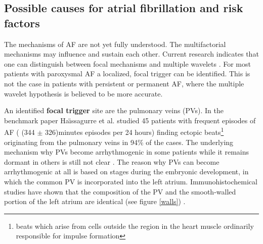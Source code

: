   
% 
% 


\newpage
\subsection{Possible causes for atrial fibrillation and risk factors}
\label{AFriskfactor}

The mechanisms of AF are not yet fully understood. The multifactorial mechanisms may influence and sustain each other. 
Current research indicates that one can distinguish between focal 
mechanisms and multiple wavelets \cite{CE09}. For most patients with paroxysmal AF a localized, focal trigger can be identified. This is 
not the case in patients with persistent or permanent AF, where the multiple wavelet hypothesis is believed to be more accurate.\newline

An identified \textbf{focal trigger} site are the pulmonary veins (PVs). In the benchmark paper Ha\"{\i}ssagurre et al. \cite{Hai98} studied 
45 patients with frequent episodes of AF ( (344 $\pm$ 326)minutes episodes per 24 hours) finding ectopic beats\footnote{beats which arise 
from cells outside the region in the heart muscle ordinarily responsible for impulse formation} originating from the pulmonary veins in 
94\% of the cases. The underlying mechanism why PVs become arrhythmogenic in some patients while it remains dormant in others is 
still not clear \cite{CE09}. The reason why PVs can become arrhythmogenic at all is based on stages during the embryonic development, in 
which the common PV is incorporated into the left atrium. Immunohistochemical studies have shown that the composition of the PV and the 
smooth-walled portion of the left atrium are identical (see figure \ref{walls}) \cite{CE09, Doug06}. 

